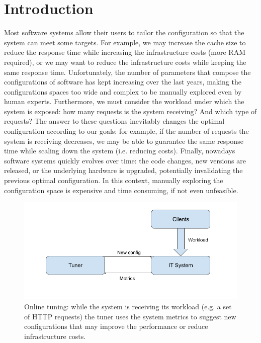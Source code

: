\documentclass[a4paper, 12pt]{article} %
\begin{document}
	\section{Introduction }
	Most software systems allow their users to tailor the configuration so that the system can meet some targets. For example, we may increase the cache size to reduce the response time while increasing the infrastructure costs (more RAM required), or we may want to reduce the infrastructure costs while keeping the same response time.  Unfortunately, the number of parameters that compose the configurations of software has kept increasing over the last years, making the configurations spaces too wide and complex to be manually explored even by human experts. Furthermore, we must consider the workload under which the system is exposed: how many requests is the system receiving? And which type of requests? The answer to these questions inevitably changes the optimal configuration according to our goals: for example, if the number of requests the system is receiving decreases, we may be able to guarantee the same response time while scaling down the system (i.e. reducing costs). Finally, nowadays software systems quickly evolves over time: the code changes, new versions are released, or the underlying hardware is upgraded, potentially invalidating the previous optimal configuration. In this context, manually exploring the configuration space is expensive and time consuming, if not even unfeasible.	
	
	\begin{figure}[!b] \label{fig:online_tuning}
		\includegraphics[width=\linewidth]{img/online_tuning.png}
		\caption{Online tuning: while the system is receiving its workload (e.g. a set of HTTP requests) the tuner uses the system metrics to suggest new configurations that may improve the performance or reduce infrastructure costs.}
	\end{figure}
	
\end{document}

